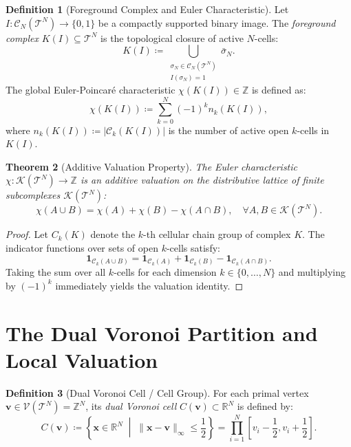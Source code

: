 \documentclass[11pt,a4paper]{article}
\theoremstyle{plain}
\newtheorem{theorem}{Theorem}[section]
\theoremstyle{definition}
\newtheorem{definition}[theorem]{Definition}
\theoremstyle{remark}
\newcommand{\R}{\mathbb{R}}
\newcommand{\Z}{\mathbb{Z}}
\newcommand{\T}{\mathcal{T}}
\newcommand{\V}{\mathcal{V}}
\newcommand{\indicator}{\mathbf{1}}
\begin{document}
\begin{definition}[Foreground Complex and Euler Characteristic]
Let $I : \mathcal{C}_N(\T^N) \to \{0, 1\}$ be a compactly supported binary image. The \emph{foreground complex} $K(I) \subseteq \T^N$ is the topological closure of active $N$-cells:
\begin{equation}
    K(I) \coloneqq \bigcup_{\substack{\sigma_N \in \mathcal{C}_N(\T^N) \\ I(\sigma_N) = 1}} \bar{\sigma}_N.
\end{equation}
The global Euler-Poincaré characteristic $\chi(K(I)) \in \Z$ is defined as:
\begin{equation}
\label{eq:euler_global}
    \chi(K(I)) \coloneqq \sum_{k=0}^N (-1)^k n_k(K(I)),
\end{equation}
where $n_k(K(I)) \coloneqq |\mathcal{C}_k(K(I))|$ is the number of active open $k$-cells in $K(I)$.
\end{definition}

\begin{theorem}[Additive Valuation Property]
The Euler characteristic $\chi : \mathcal{K}(\T^N) \to \Z$ is an additive valuation on the distributive lattice of finite subcomplexes $\mathcal{K}(\T^N)$:
\begin{equation}
    \chi(A \cup B) = \chi(A) + \chi(B) - \chi(A \cap B), \quad \forall A, B \in \mathcal{K}(\T^N).
\end{equation}
\end{theorem}
\begin{proof}
Let $C_k(K)$ denote the $k$-th cellular chain group of complex $K$. The indicator functions over sets of open $k$-cells satisfy:
\begin{equation}
    \indicator_{\mathcal{C}_k(A \cup B)} = \indicator_{\mathcal{C}_k(A)} + \indicator_{\mathcal{C}_k(B)} - \indicator_{\mathcal{C}_k(A \cap B)}.
\end{equation}
Taking the sum over all $k$-cells for each dimension $k \in \{0, \dots, N\}$ and multiplying by $(-1)^k$ immediately yields the valuation identity.
\end{proof}

\section{The Dual Voronoi Partition and Local Valuation}

\begin{definition}[Dual Voronoi Cell / Cell Group]
For each primal vertex $\mathbf{v} \in \V(\T^N) = \Z^N$, its \emph{dual Voronoi cell} $C(\mathbf{v}) \subset \R^N$ is defined by:
\begin{equation}
    C(\mathbf{v}) \coloneqq \left\{ \mathbf{x} \in \R^N \;\middle|\; \|\mathbf{x} - \mathbf{v}\|_\infty \le \frac{1}{2} \right\} = \prod_{i=1}^N \left[ v_i - \frac{1}{2}, v_i + \frac{1}{2} \right].
\end{equation}
\end{definition}
\end{document}
